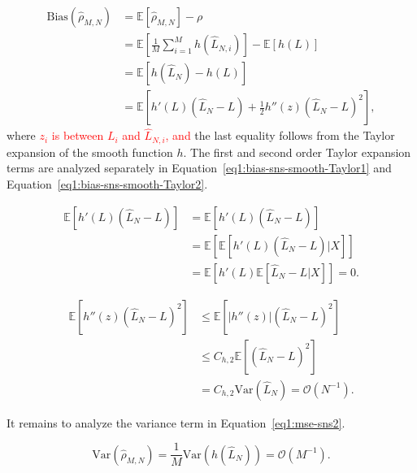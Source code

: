 \begin{align}\label{eq1:bias-sns-smooth}
    \text{Bias}(\hat{\rho}_{M, N})
    & = \mathbb{E} \left[ \hat{\rho}_{M, N} \right] - \rho \nonumber \\
    & = \mathbb{E} \left[ \frac{1}{M} \sum_{i=1}^M h\left( \hat{L}_{N, i} \right) \right] - \mathbb{E} \left[ h\left(L \right) \right]  \nonumber \\
    & = \mathbb{E} \left[ h\left( \hat{L}_N \right) - h\left( L \right) \right] \nonumber \\
    & = \mathbb{E} \left[h'\left( L \right) \left( \hat{L}_N - L \right) + \frac{1}{2} h''\left( z \right) \left( \hat{L}_N - L \right)^2 \right],
\end{align}
where \textcolor{red}{$z_i$ is between $L_i$ and $\hat{L}_{N,i}$, and} the last equality follows from the Taylor expansion of the smooth function $h$.
The first and second order Taylor expansion terms are analyzed separately in Equation~\eqref{eq1:bias-sns-smooth-Taylor1} and Equation~\eqref{eq1:bias-sns-smooth-Taylor2}.

\begin{align}\label{eq1:bias-sns-smooth-Taylor1}
    \mathbb{E} \left[ h'\left( L \right) \left( \hat{L}_N - L \right) \right]
    & = \mathbb{E} \left[ h'\left( L \right) \left( \hat{L}_N - L \right) \right] \nonumber \\
    & = \mathbb{E} \left[ \mathbb{E} \left[ h'\left( L \right) \left( \hat{L}_N - L \right)  | X \right] \right] \nonumber \\
    & = \mathbb{E} \left[ h'\left( L \right) \mathbb{E} \left[ \hat{L}_N - L  | X \right] \right] = 0.
\end{align}

\begin{align}\label{eq1:bias-sns-smooth-Taylor2}
    \mathbb{E} \left[ h''\left( z \right) \left( \hat{L}_N - L \right)^2 \right]
    & \leq \mathbb{E} \left[ |h''\left( z \right)| \left( \hat{L}_N - L \right)^2 \right] \nonumber \\
    & \leq C_{h,2} \mathbb{E} \left[ \left( \hat{L}_N - L \right)^2 \right] \nonumber \\
    & = C_{h,2} \text{Var}(\hat{L}_N) = \mathcal{O}\left( N^{-1} \right).
\end{align}

It remains to analyze the variance term in Equation~\eqref{eq1:mse-sns2}.

\begin{equation}\label{eq1:var-sns-smooth}
    \text{Var}(\hat{\rho}_{M, N}) = \frac{1}{M} \text{Var}(h(\hat{L}_N)) = \mathcal{O}(M^{-1}).
\end{equation}

